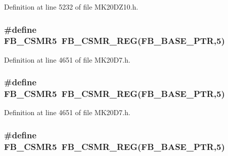 Definition at line 5232 of file M\+K20\+D\+Z10.\+h.

\subsubsection[{\texorpdfstring{F\+B\+\_\+\+C\+S\+M\+R5}{FB_CSMR5}}]{\setlength{\rightskip}{0pt plus 5cm}\#define F\+B\+\_\+\+C\+S\+M\+R5~{\bf F\+B\+\_\+\+C\+S\+M\+R\+\_\+\+R\+EG}({\bf F\+B\+\_\+\+B\+A\+S\+E\+\_\+\+P\+TR},5)}\hypertarget{group___f_b___register___accessor___macros_ga30af2b4c4790c87f28b2761b0961a1a3}{}\label{group___f_b___register___accessor___macros_ga30af2b4c4790c87f28b2761b0961a1a3}


Definition at line 4651 of file M\+K20\+D7.\+h.

\subsubsection[{\texorpdfstring{F\+B\+\_\+\+C\+S\+M\+R5}{FB_CSMR5}}]{\setlength{\rightskip}{0pt plus 5cm}\#define F\+B\+\_\+\+C\+S\+M\+R5~{\bf F\+B\+\_\+\+C\+S\+M\+R\+\_\+\+R\+EG}({\bf F\+B\+\_\+\+B\+A\+S\+E\+\_\+\+P\+TR},5)}\hypertarget{group___f_b___register___accessor___macros_ga30af2b4c4790c87f28b2761b0961a1a3}{}\label{group___f_b___register___accessor___macros_ga30af2b4c4790c87f28b2761b0961a1a3}


Definition at line 4651 of file M\+K20\+D7.\+h.

\subsubsection[{\texorpdfstring{F\+B\+\_\+\+C\+S\+M\+R5}{FB_CSMR5}}]{\setlength{\rightskip}{0pt plus 5cm}\#define F\+B\+\_\+\+C\+S\+M\+R5~{\bf F\+B\+\_\+\+C\+S\+M\+R\+\_\+\+R\+EG}({\bf F\+B\+\_\+\+B\+A\+S\+E\+\_\+\+P\+TR},5)}\hypertarget{group___f_b___register___accessor___macros_ga30af2b4c4790c87f28b2761b0961a1a3}{}\label{group___f_b___register___accessor___macros_ga30af2b4c4790c87f28b2761b0961a1a3}


